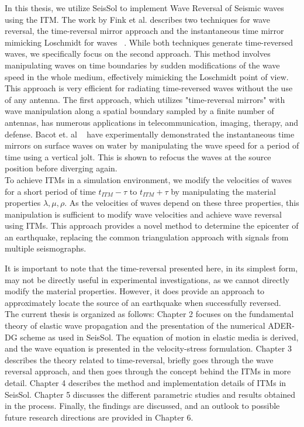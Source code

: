 In this thesis, we utilize SeisSol to implement Wave Reversal of Seismic waves using the \ac{ITM}. 
The work by Fink et al. describes two techniques for wave reversal, the time-reversal mirror approach and the instantaneous time mirror mimicking Loschmidt for waves ~\parencite{Fink2017}. 
While both techniques generate time-reversed waves, we specifically focus on the second approach. 
This method involves manipulating waves on time boundaries by sudden modifications of the wave speed in the whole medium, effectively mimicking the Loschmidt point of view. 
This approach is very efficient for radiating time-reversed waves without the use of any antenna. 
The first approach, which utilizes "time-reversal mirrors" with wave manipulation along a spatial boundary sampled by a finite number of antennas, has numerous applications in telecommunication, imaging, therapy, and defense.
Bacot et. al ~\parencite{Bacot2016} have experimentally demonstrated the instantaneous time mirrors on surface waves on water by manipulating the wave speed for a period of time using a vertical jolt.
This is shown to refocus the waves at the source position before diverging again.\\

To achieve \ac{ITM}s in a simulation environment, we modify the velocities of waves for a short period of time $t_{ITM} - \tau$ to $t_{ITM} + \tau$ by manipulating 
the material properties $\lambda, \mu, \rho$. As the velocities of waves depend on these three properties, this manipulation is 
sufficient to modify wave velocities and achieve wave reversal using \ac{ITM}s. This approach provides a novel method to determine 
the epicenter of an earthquake, replacing the common triangulation approach with signals from multiple seismographs.

It is important to note that the time-reversal presented here, in its simplest form, may not be directly useful in experimental 
investigations, as we cannot directly modify the material properties. However, it does provide an approach to approximately 
locate the source of an earthquake when successfully reversed. \\

The current thesis is organized as follows: Chapter 2 focuses on the fundamental theory of elastic wave propagation and the presentation
of the numerical ADER-DG scheme as used in SeisSol. The equation of motion in elastic media is derived, and the wave equation is presented
in the velocity-stress formulation. Chapter 3 describes the theory related to time-reversal, briefly goes through the wave reversal approach,
and then goes through the concept behind the \ac{ITM}s in more detail. Chapter 4 describes the method and implementation details of \ac{ITM}s
in SeisSol. Chapter 5 discusses the different parametric studies and results obtained in the process. Finally, the findings are discussed,
and an outlook to possible future research directions are provided in Chapter 6. 


